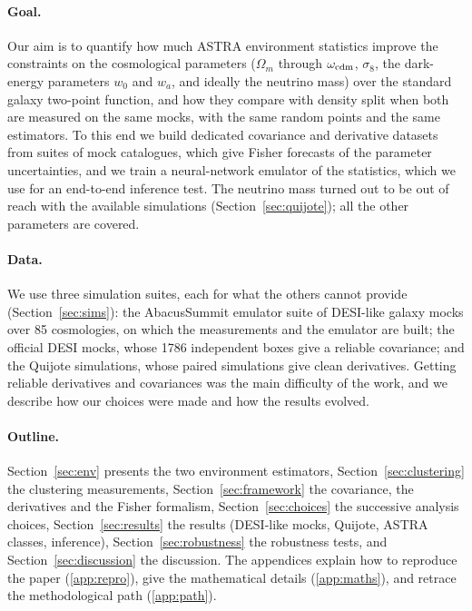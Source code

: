 \paragraph{Goal.} Our aim is to quantify how much ASTRA environment statistics improve the constraints on the cosmological parameters ($\Omega_m$ through $\omega_{\rm cdm}$, $\sigma_8$, the dark-energy parameters $w_0$ and $w_a$, and ideally the neutrino mass) over the standard galaxy two-point function, and how they compare with density split when both are measured on the same mocks, with the same random points and the same estimators. To this end we build dedicated covariance and derivative datasets from suites of mock catalogues, which give Fisher forecasts of the parameter uncertainties, and we train a neural-network emulator of the statistics, which we use for an end-to-end inference test. The neutrino mass turned out to be out of reach with the available simulations (Section~\ref{sec:quijote}); all the other parameters are covered.

\paragraph{Data.} We use three simulation suites, each for what the others cannot provide (Section~\ref{sec:sims}): the AbacusSummit emulator suite of DESI-like galaxy mocks over 85 cosmologies, on which the measurements and the emulator are built; the official DESI mocks, whose 1786 independent boxes give a reliable covariance; and the Quijote simulations, whose paired simulations give clean derivatives. Getting reliable derivatives and covariances was the main difficulty of the work, and we describe how our choices were made and how the results evolved.

\paragraph{Outline.} Section~\ref{sec:env} presents the two environment estimators, Section~\ref{sec:clustering} the clustering measurements, Section~\ref{sec:framework} the covariance, the derivatives and the Fisher formalism, Section~\ref{sec:choices} the successive analysis choices, Section~\ref{sec:results} the results (DESI-like mocks, Quijote, ASTRA classes, inference), Section~\ref{sec:robustness} the robustness tests, and Section~\ref{sec:discussion} the discussion. The appendices explain how to reproduce the paper (\ref{app:repro}), give the mathematical details (\ref{app:maths}), and retrace the methodological path (\ref{app:path}).
